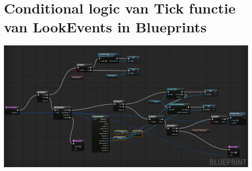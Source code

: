 \chapter{Conditional logic van Tick functie van LookEvents in Blueprints}
\label{appendix:LookEventsLogicBlueprints}
\includegraphics[width=\linewidth,height=\textheight,keepaspectratio]{Figures/WasHitBytTraceBluePrintExample.png}